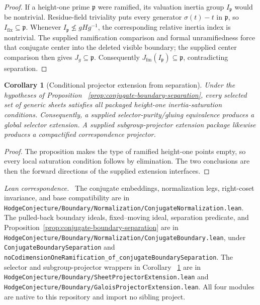 \documentclass[11pt]{article}
\newtheorem{corollary}[theorem]{Corollary}
\theoremstyle{definition}
\theoremstyle{remark}
\newcommand{\leanpath}[1]{\texttt{\nolinkurl{#1}}}
\newcommand{\normsrc}[1]{%
  \leanpath{HodgeConjecture/Boundary/Normalization/#1}}
\newcommand{\boundarysrc}[1]{%
  \leanpath{HodgeConjecture/Boundary/#1}}
\newenvironment{leanfiles}
  {\par\medskip\begingroup\footnotesize\raggedright\noindent
   \textit{Lean correspondence.}\ }
  {\par\endgroup\medskip}
\begin{document}
\begin{proof}
If a height-one prime \(\mathfrak p\) were ramified, its valuation inertia
group \(I_{\mathfrak p}\) would be nontrivial.  Residue-field triviality puts
every generator \(\sigma(t)-t\) in \(\mathfrak p\), so
\(I_{\mathrm{fix}}\subseteq\mathfrak p\).  Whenever
\(I_{\mathfrak p}\not\leq gHg^{-1}\), the corresponding relative inertia
index is nontrivial.  The supplied ramification comparison and formal
unramifiedness force that conjugate center into the deleted visible boundary;
the supplied center comparison then gives \(J_g\subseteq\mathfrak p\).
Consequently \(J_{\mathrm{fm}}(I_{\mathfrak p})\subseteq\mathfrak p\),
contradicting separation.
\end{proof}

\begin{corollary}[Conditional projector extension from separation]
\label{cor:separation-projector-extension}
Under the hypotheses of Proposition
~\ref{prop:conjugate-boundary-separation}, every selected set of generic
sheets satisfies all packaged height-one inertia-saturation conditions.
Consequently, a supplied selector-purity/gluing equivalence produces a
global selector extension.  A supplied subgroup-projector extension package
likewise produces a compactified correspondence projector.
\end{corollary}

\begin{proof}
The proposition makes the type of ramified height-one points empty, so every
local saturation condition follows by elimination.  The two conclusions
are then the forward directions of the supplied extension interfaces.
\end{proof}

\begin{leanfiles}
The conjugate embeddings, normalization legs, right-coset invariance, and
base compatibility are in \normsrc{ConjugateNormalization.lean}.  The
pulled-back boundary ideals, fixed--moving ideal, separation predicate, and
Proposition~\ref{prop:conjugate-boundary-separation} are in
\normsrc{ConjugateBoundary.lean}, under
\leanpath{ConjugateBoundarySeparation} and
\leanpath{noCodimensionOneRamification_of_conjugateBoundarySeparation}.
The selector and subgroup-projector wrappers in Corollary
~\ref{cor:separation-projector-extension} are in
\boundarysrc{SheetProjectorExtension.lean} and
\boundarysrc{GaloisProjectorExtension.lean}.
All four modules are native to this repository and import no sibling project.
\end{leanfiles}
\end{document}
